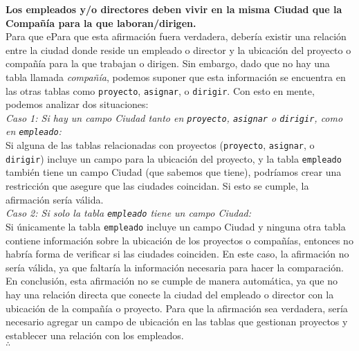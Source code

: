 \textbf{Los empleados y/o directores deben vivir en la misma Ciudad que la Compañía para la que laboran/dirigen.}\vspace{.3cm} \\

Para que ePara que esta afirmación fuera verdadera, debería existir una relación entre la ciudad donde reside un empleado o director y la ubicación del proyecto o compañía para la que trabajan o dirigen. Sin embargo, dado que no hay una tabla llamada \textit{compañía}, podemos suponer que esta información se encuentra en las otras tablas como \texttt{proyecto}, \texttt{asignar}, o \texttt{dirigir}. Con esto en mente, podemos analizar dos situaciones: \\

\textit{Caso 1: Si hay un campo Ciudad tanto en \texttt{proyecto}, \texttt{asignar} o \texttt{dirigir}, como en \texttt{empleado}:} \\

Si alguna de las tablas relacionadas con proyectos (\texttt{proyecto}, \texttt{asignar}, o \texttt{dirigir}) incluye un campo para la ubicación del proyecto, y la tabla \texttt{empleado} también tiene un campo Ciudad (que sabemos que tiene), podríamos crear una restricción que asegure que las ciudades coincidan. Si esto se cumple, la afirmación sería válida. \\

\textit{Caso 2: Si solo la tabla \texttt{empleado} tiene un campo Ciudad:} \\

Si únicamente la tabla \texttt{empleado} incluye un campo Ciudad y ninguna otra tabla contiene información sobre la ubicación de los proyectos o compañías, entonces no habría forma de verificar si las ciudades coinciden. En este caso, la afirmación no sería válida, ya que faltaría la información necesaria para hacer la comparación. \\

En conclusión, esta afirmación no se cumple de manera automática, ya que no hay una relación directa que conecte la ciudad del empleado o director con la ubicación de la compañía o proyecto. Para que la afirmación sea verdadera, sería necesario agregar un campo de ubicación en las tablas que gestionan proyectos y establecer una relación con los empleados. \\

$\therefore$ \\
